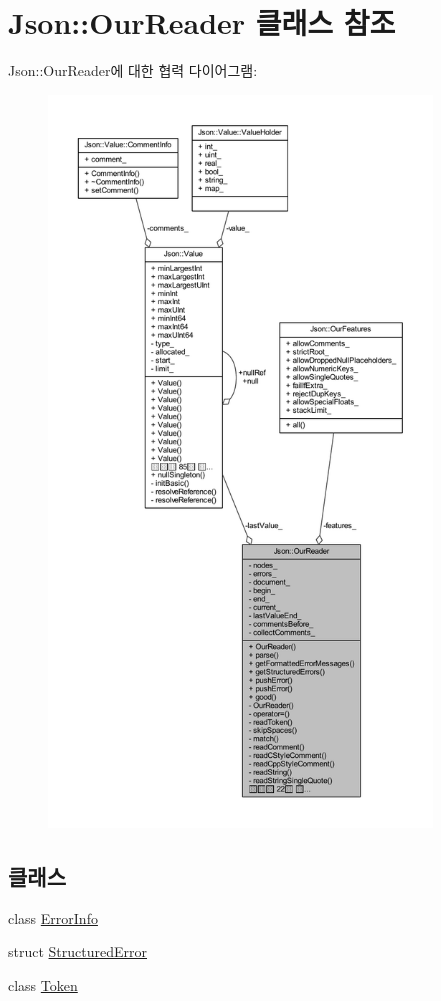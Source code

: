 \hypertarget{class_json_1_1_our_reader}{}\section{Json\+:\+:Our\+Reader 클래스 참조}
\label{class_json_1_1_our_reader}


Json\+:\+:Our\+Reader에 대한 협력 다이어그램\+:
\nopagebreak
\begin{figure}[H]
\begin{center}
\leavevmode
\includegraphics[height=550pt]{class_json_1_1_our_reader__coll__graph}
\end{center}
\end{figure}
\subsection*{클래스}
\begin{DoxyCompactItemize}
\item 
class \hyperlink{class_json_1_1_our_reader_1_1_error_info}{Error\+Info}
\item 
struct \hyperlink{struct_json_1_1_our_reader_1_1_structured_error}{Structured\+Error}
\item 
class \hyperlink{class_json_1_1_our_reader_1_1_token}{Token}
\end{DoxyCompactItemize}
